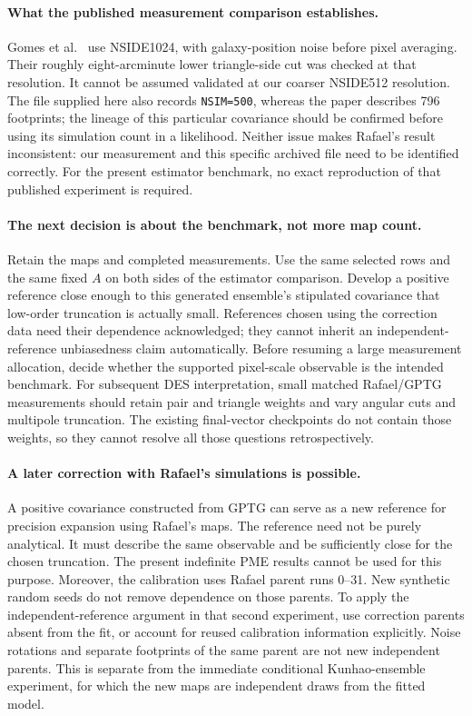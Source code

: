 \documentclass[11pt]{article}
\begin{document}
\paragraph{What the published measurement comparison establishes.}
Gomes et al.~\cite{gomes} use NSIDE1024, with galaxy-position noise before
pixel averaging. Their roughly eight-arcminute lower triangle-side cut
was checked at that resolution. It cannot be assumed validated at our
coarser NSIDE512 resolution. The file supplied here also records
\texttt{NSIM=500}, whereas the paper describes 796 footprints; the lineage
of this particular covariance should be confirmed before using its
simulation count in a likelihood. Neither issue makes Rafael's result
inconsistent: our measurement and this specific archived file need to
be identified correctly. For the present estimator benchmark, no exact
reproduction of that published experiment is required.

\paragraph{The next decision is about the benchmark, not more map count.}
Retain the maps and completed measurements. Use the same selected rows
and the same fixed $A$ on both sides of the estimator comparison. Develop
a positive reference close enough to this generated ensemble's stipulated
covariance that low-order truncation is actually small. References chosen
using the correction data need their dependence acknowledged; they cannot
inherit an independent-reference unbiasedness claim automatically. Before
resuming a large measurement allocation, decide whether the supported
pixel-scale observable is the intended benchmark. For subsequent DES
interpretation, small matched Rafael/GPTG measurements should retain pair
and triangle weights and vary angular cuts and multipole truncation.
The existing final-vector checkpoints do not contain those weights, so
they cannot resolve all those questions retrospectively.

\paragraph{A later correction with Rafael's simulations is possible.}
A positive covariance constructed from GPTG can serve as a new reference
for precision expansion using Rafael's maps. The reference need not be
purely analytical. It must describe the same observable and be sufficiently
close for the chosen truncation. The present indefinite PME results cannot
be used for this purpose. Moreover, the calibration uses Rafael parent
runs 0--31. New synthetic random seeds do not remove dependence on those
parents. To apply the independent-reference argument in that second
experiment, use correction parents absent from the fit, or account for
reused calibration information explicitly. Noise rotations and separate
footprints of the same parent are not new independent parents. This is
separate from the immediate conditional Kunhao-ensemble experiment, for
which the new maps are independent draws from the fitted model.
\end{document}
